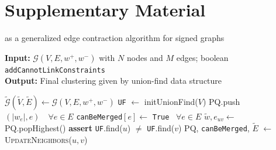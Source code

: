 
\section{Supplementary Material}

\begin{algorithm}
  \caption{\algname{} as a generalized edge contraction algorithm for signed graphs}
\hspace*{\algorithmicindent} \textbf{Input:} $\mathcal{G}(V,E,w^+,w^-)$ with $N$ nodes and $M$ edges; boolean \texttt{{\color{blue}addCannotLinkConstraints}} \\
\hspace*{\algorithmicindent} \textbf{Output:} Final clustering given by union-find data structure \\
  \hspace*{\algorithmicindent} 
  \begin{algorithmic}[1]
      \State $\tilde{\mathcal{G}}(\tilde{V},\tilde{E}) \gets \mathcal{G}(V,E,w^+,w^-)$  
      \State \texttt{UF} $\gets$ initUnionFind($V$) 
        \State PQ.push$(|w_e|, e) \quad \forall e \in E $  
        \State \texttt{canBeMerged}$[e] \gets$ \texttt{True} $\,\,\, \forall e\in E$ 
    \State
        \State $\tilde{w}, e_{uv} \gets $ PQ.popHighest() 
        \State \textbf{assert} \texttt{UF}.find($u$) $\neq$ \texttt{UF}.find($v$) 
          \State PQ, \texttt{canBeMerged}, $\tilde{E}$ $\gets$ \textsc{UpdateNeighbors}($u,v$)
          

\end{algorithmic}
\end{algorithm}
